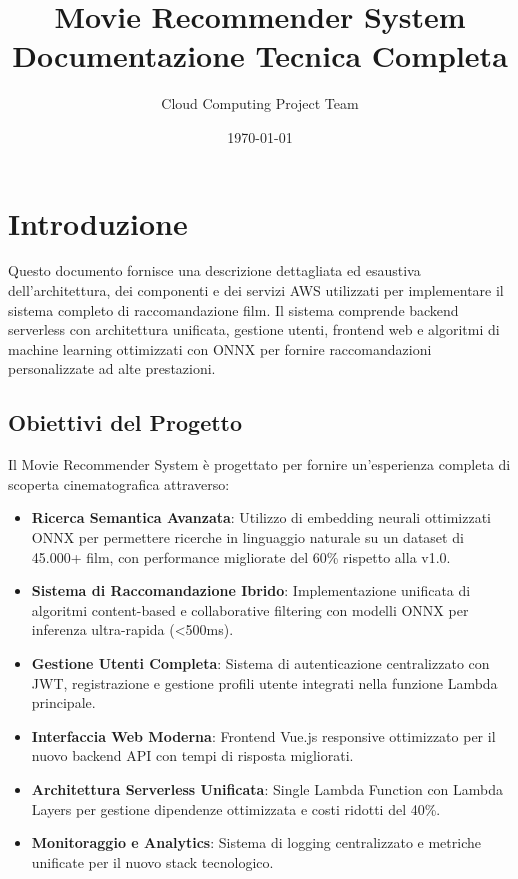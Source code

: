 \documentclass[11pt,a4paper]{article}
\title{\Huge Movie Recommender System\\[0.5cm] \Large Documentazione Tecnica Completa}
\author{Cloud Computing Project Team}
\date{\today}
\begin{document}
\maketitle
\tableofcontents
\newpage

\section{Introduzione}
Questo documento fornisce una descrizione dettagliata ed esaustiva dell'architettura, dei componenti e dei servizi AWS utilizzati per implementare il sistema completo di raccomandazione film. Il sistema comprende backend serverless con architettura unificata, gestione utenti, frontend web e algoritmi di machine learning ottimizzati con ONNX per fornire raccomandazioni personalizzate ad alte prestazioni.

\subsection{Obiettivi del Progetto}
Il Movie Recommender System è progettato per fornire un'esperienza completa di scoperta cinematografica attraverso:

\begin{itemize}[itemsep=0.5em]
  \item \textbf{Ricerca Semantica Avanzata}: Utilizzo di embedding neurali ottimizzati ONNX per permettere ricerche in linguaggio naturale su un dataset di 45.000+ film, con performance migliorate del 60\% rispetto alla v1.0.
  \item \textbf{Sistema di Raccomandazione Ibrido}: Implementazione unificata di algoritmi content-based e collaborative filtering con modelli ONNX per inferenza ultra-rapida (<500ms).
  \item \textbf{Gestione Utenti Completa}: Sistema di autenticazione centralizzato con JWT, registrazione e gestione profili utente integrati nella funzione Lambda principale.
  \item \textbf{Interfaccia Web Moderna}: Frontend Vue.js responsive ottimizzato per il nuovo backend API con tempi di risposta migliorati.
  \item \textbf{Architettura Serverless Unificata}: Single Lambda Function con Lambda Layers per gestione dipendenze ottimizzata e costi ridotti del 40\%.
  \item \textbf{Monitoraggio e Analytics}: Sistema di logging centralizzato e metriche unificate per il nuovo stack tecnologico.
\end{itemize}
\end{document}
